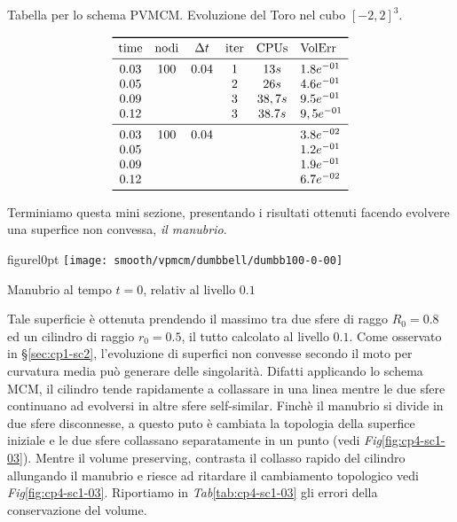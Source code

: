\begin{table}[htb!]
\caption{Tabella per lo schema PVMCM. Evoluzione del Toro nel cubo $[-2,2]^3$.}
\label{tab:cp4-sc1-02}
\[
\begin{array}{*{5}{c}l}
    \toprule
    \text{time} &\text{nodi} &\Delta t &\text{iter} &\text{CPUs}&\text{VolErr} \\
    \midrule
     0.03       & 100        & 0.04    & 1          & 13s      &1.8e^{-01}\\
     0.05       &            &         & 2          & 26s      &4.6e^{-01}\\ 
     0.09       &            &         & 3          & 38,7s    &9.5e^{-01}\\ 
     0.12       &            &         & 3          & 38.7s    &9,5e^{-01}\\
     \midrule
     0.03       & 100        & 0.04    &            &           &3.8e^{-02}\\ 
     0.05       &            &         &            &           &1.2e^{-01}\\
     0.09       &            &         &            &           &1.9e^{-01}\\ 
     0.12       &            &         &            &           &6.7e^{-02}\\
    \bottomrule
\end{array}
\]
\end{table}

\newpage

Terminiamo questa mini sezione, presentando i risultati ottenuti
facendo evolvere una superfice non convessa, \emph{il manubrio}.

\begin{wrapfloat}{figure}{l}{0pt}
\texttt{[image: smooth/vpmcm/dumbbell/dumbb100-0-00]}
\caption{Manubrio al tempo $t=0$, relativ al livello $0.1$}
\end{wrapfloat}

Tale superficie è ottenuta prendendo il massimo tra due sfere di raggo
$R_0=0.8$ ed un cilindro di raggio $r_0=0.5$, il tutto calcolato al
livello $0.1$. Come osservato in §\ref{sec:cp1-sc2}, l'evoluzione di
superfici non convesse secondo il moto per curvatura media può
generare delle singolarità. Difatti applicando lo schema MCM, il
cilindro tende rapidamente a collassare in una linea mentre le due
sfere continuano ad evolversi in altre sfere self-similar. Finchè il
manubrio si divide in due sfere disconnesse, a questo puto è cambiata
la topologia della superfice iniziale e le due sfere collassano
separatamente in un punto (vedi \emph{Fig}\ref{fig:cp4-sc1-03}).
Mentre il volume preserving, contrasta il collasso rapido  del
cilindro allungando il manubrio e riesce ad ritardare il cambiamento
topologico vedi \emph{Fig}\ref{fig:cp4-sc1-03}. Riportiamo in \emph{Tab}\ref{tab:cp4-sc1-03}  gli errori
della conservazione del volume.

